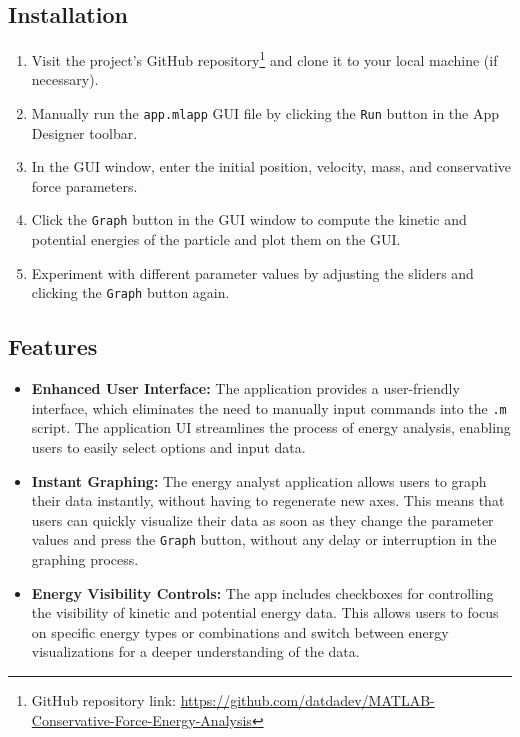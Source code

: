 \documentclass[13pt,a4paper]{report}
\begin{document}
\subsection{Installation}
\begin{enumerate}[leftmargin=0.6cm,itemindent=0.05cm]
    \item Visit the project's GitHub repository\footnote[3]{GitHub repository link: \url{https://github.com/datdadev/MATLAB-Conservative-Force-Energy-Analysis}} and clone it to your local machine (if necessary).
    \item Manually run the \texttt{app.mlapp} GUI file by clicking the \texttt{Run} button in the App Designer toolbar.
    \item In the GUI window, enter the initial position, velocity, mass, and conservative force parameters.
    \item Click the \texttt{Graph} button in the GUI window to compute the kinetic and potential energies of the particle and plot them on the GUI.
    \item Experiment with different parameter values by adjusting the sliders and clicking the \texttt{Graph} button again.
\end{enumerate}

\subsection{Features}
\begin{itemize}[leftmargin=0.65cm,itemsep=0.25cm]
    \item \textbf{Enhanced User Interface:} The application provides a user-friendly interface, which eliminates the need to manually input commands into the \texttt{.m} script. The application UI streamlines the process of energy analysis, enabling users to easily select options and input data.
    \item \textbf{Instant Graphing:} The energy analyst application allows users to graph their data instantly, without having to regenerate new axes. This means that users can quickly visualize their data as soon as they change the parameter values and press the \texttt{Graph} button, without any delay or interruption in the graphing process.
    \item \textbf{Energy Visibility Controls:} The app includes checkboxes for controlling the visibility of kinetic and potential energy data. This allows users to focus on specific energy types or combinations and switch between energy visualizations for a deeper understanding of the data.
\end{itemize}
\end{document}
